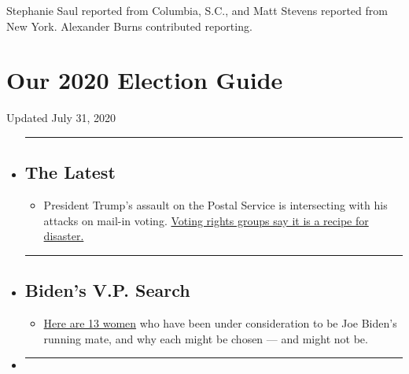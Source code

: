 Stephanie Saul reported from Columbia, S.C., and Matt Stevens reported
from New York. Alexander Burns contributed reporting.

\hypertarget{our-2020-election-guide}{%
\section{Our 2020 Election Guide}\label{our-2020-election-guide}}

Updated July 31, 2020

\begin{itemize}
\item
  \begin{center}\rule{0.5\linewidth}{\linethickness}\end{center}

  \hypertarget{the-latest}{%
  \subsection{The Latest}\label{the-latest}}

  \begin{itemize}
  \tightlist
  \item
    President Trump's assault on the Postal Service is intersecting with
    his attacks on mail-in voting.
    \href{https://www.nytimes.com/2020/07/31/us/politics/trump-usps-mail-delays.html?action=click\&pgtype=Article\&state=default\&region=BELOW_MAIN_CONTENT\&context=storylines_guide}{Voting
    rights groups say it is a recipe for disaster.}
  \end{itemize}
\item
  \begin{center}\rule{0.5\linewidth}{\linethickness}\end{center}

  \hypertarget{bidens-vp-search}{%
  \subsection{Biden's V.P. Search}\label{bidens-vp-search}}

  \begin{itemize}
  \tightlist
  \item
    \href{https://www.nytimes.com/article/biden-vice-president-2020.html?action=click\&pgtype=Article\&state=default\&region=BELOW_MAIN_CONTENT\&context=storylines_guide}{Here
    are 13 women} who have been under consideration to be Joe Biden's
    running mate, and why each might be chosen --- and might not be.
  \end{itemize}
\item
  \begin{center}\rule{0.5\linewidth}{\linethickness}\end{center}


\end{itemize}
